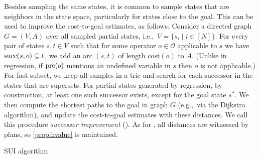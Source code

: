 Besides sampling the same states, it is common to sample states that are neighbors in the state space, particularly for states close to the goal. This can be used to improve the cost-to-goal estimates, as follows. Consider a directed graph $G=(V,A)$ over all sampled partial states, i.e.,~$V=\{s_i\mid i\in[N]\}$. For every pair of states $s,t\in V$ such that for some operator $o\in\mathcal{O}$ applicable to $s$ we have $\operatorname{succ}(s,o)\subseteq t$, we add an arc $(s,t)$ of length $\text{cost}(o)$ to $A$. (Unlike in regression, if $\operatorname{pre}(o)$ mentions an undefined variable in $s$ then $o$ is not applicable.) For fast subset, we keep all samples in a trie and search for each successor in the states that are supersets. For partial states generated by regression, by construction, at least one such successor exists, except for the goal state $s^*$. We then compute the shortest paths to the goal in graph $G$ (e.g.,~via the Dijkstra algorithm), and update the cost-to-goal estimates with these distances. We call this procedure \emph{successor improvement} (\hvfc). As for \hmin, all distances are witnessed by plans, so \cref{prop:hvalue} is maintained.

\begin{algorithm}[H]
    \SetAlgoLined




    \caption{SUI algorithm}
    \label{alg:sui}
\end{algorithm}

